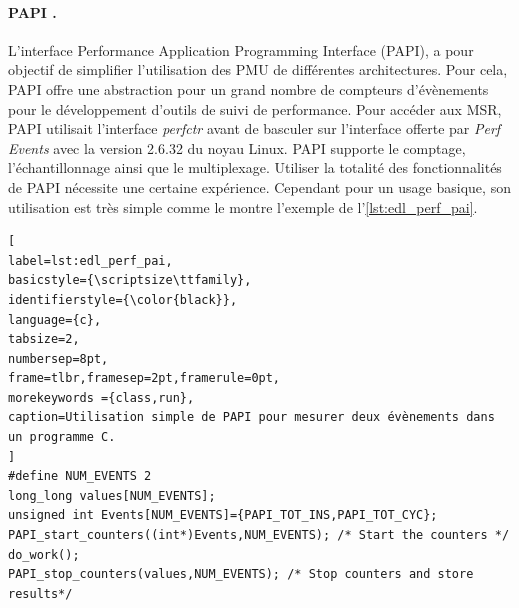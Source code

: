         \paragraph{PAPI \cite{Browne2000}.}
            
            L'interface Performance Application Programming Interface (PAPI), a pour objectif de simplifier l'utilisation des PMU de différentes architectures. Pour cela, PAPI offre une abstraction pour un grand nombre de compteurs d'évènements pour le développement d'outils de suivi de performance. Pour accéder aux MSR, PAPI utilisait l'interface \textit{perfctr} avant de basculer sur l'interface offerte par \textit{Perf Events} avec la version 2.6.32 du noyau Linux. PAPI supporte le comptage, l'échantillonnage ainsi que le multiplexage. Utiliser la totalité des fonctionnalités de PAPI nécessite une certaine expérience. Cependant pour un usage basique, son utilisation est très simple comme le montre l'exemple de l'\autoref{lst:edl_perf_pai}.

\begin{lstlisting}[
label=lst:edl_perf_pai,
basicstyle={\scriptsize\ttfamily},
identifierstyle={\color{black}},
language={c},
tabsize=2,
numbersep=8pt,
frame=tlbr,framesep=2pt,framerule=0pt,
morekeywords ={class,run},
caption=Utilisation simple de PAPI pour mesurer deux évènements dans un programme C.
]
#define NUM_EVENTS 2  
long_long values[NUM_EVENTS];
unsigned int Events[NUM_EVENTS]={PAPI_TOT_INS,PAPI_TOT_CYC};
PAPI_start_counters((int*)Events,NUM_EVENTS); /* Start the counters */
do_work();
PAPI_stop_counters(values,NUM_EVENTS); /* Stop counters and store results*/
\end{lstlisting}

